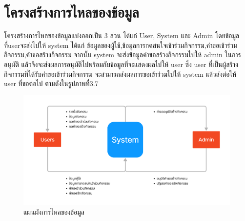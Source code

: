 \section{โครงสร้างการไหลของข้อมูล}
โครงสร้างการไหลของข้อมูลแบ่งออกเป็น 3 ส่วน ได้แก่ User, System และ Admin
โดยข้อมูลที่userจะส่งไปให้ system ได้แก่ ข้อมูลของผู้ใช้,ข้อมูลการกดสนใจเข้าร่วมกิจกรรม,คำขอเข้าร่วมกิจกรรม,คำขอสร้างกิจกรรม
จากนั้น system จะส่งข้อมูลคำขอสร้างกิจกรรมไปให้ admin ในการอนุมัติ แล้วจึงจะส่งผลการอนุมัติไปพร้อมกับข้อมูลที่จะแสดงผลไปให้ user
ซึ่ง user ที่เป็นผู้สร้างกิจกรรมที่ได้รับคำขอเข้าร่วมกิจกรรม จะสามารถส่งผลการขอเข้าร่วมไปให้ system แล้วส่งต่อให้ user ที่ขอต่อไป ตามดังในรูปภาพที่3.7
\begin{figure}[h]
\begin{center}
\includegraphics[width=0.9\linewidth]{image/dataflow-diagram.png}
\end{center}
\caption[Poem]{แผนผังการไหลของข้อมูล}
\label{fig:dataflow}
\end{figure}


